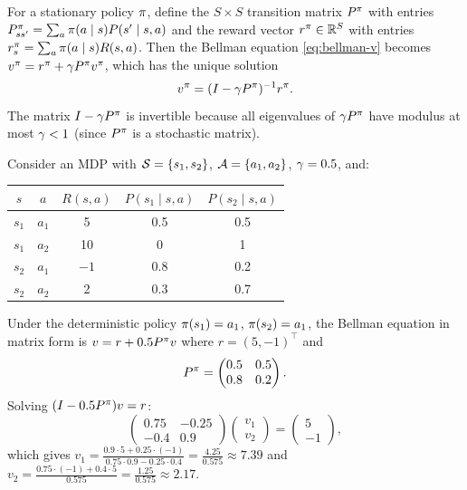 \documentclass[11pt,a4paper]{article}
\begin{document}
\begin{keyresult}[title={Bellman Expectation Equations -- Matrix Form}]
For a stationary policy $\pi$, define the $S \times S$ transition
matrix $P^\pi$ with entries
$P^\pi_{ss'} = \sum_a \pi(a \mid s) P(s' \mid s,a)$ and the
reward vector $r^\pi \in \mathbb{R}^S$ with entries
$r^\pi_s = \sum_a \pi(a \mid s) R(s,a)$. Then the Bellman
equation \eqref{eq:bellman-v} becomes $v^\pi = r^\pi +
\gamma P^\pi v^\pi$, which has the unique solution
\[
    v^\pi = (I - \gamma P^\pi)^{-1} r^\pi.
\]
The matrix $I - \gamma P^\pi$ is invertible because all
eigenvalues of $\gamma P^\pi$ have modulus at most
$\gamma < 1$ (since $P^\pi$ is a stochastic matrix).
\end{keyresult}

\begin{example}
\label{ex:two-state}
Consider an MDP with $\mathcal{S} = \{s_1, s_2\}$,
$\mathcal{A} = \{a_1, a_2\}$, $\gamma = 0.5$, and:
\begin{center}
\begin{tabular}{ccccc}
\toprule
$s$ & $a$ & $R(s,a)$ & $P(s_1 \mid s,a)$ & $P(s_2 \mid s,a)$ \\
\midrule
$s_1$ & $a_1$ & 5 & 0.5 & 0.5 \\
$s_1$ & $a_2$ & 10 & 0 & 1 \\
$s_2$ & $a_1$ & $-1$ & 0.8 & 0.2 \\
$s_2$ & $a_2$ & 2 & 0.3 & 0.7 \\
\bottomrule
\end{tabular}
\end{center}
Under the deterministic policy $\pi(s_1) = a_1$,
$\pi(s_2) = a_1$, the Bellman equation in matrix form is
$v = r + 0.5 P^\pi v$ where $r = (5, -1)^\top$ and
\[
    P^\pi = \begin{pmatrix} 0.5 & 0.5 \\ 0.8 & 0.2 \end{pmatrix}.
\]
Solving $(I - 0.5 P^\pi) v = r$:
\[
    \begin{pmatrix} 0.75 & -0.25 \\ -0.4 & 0.9 \end{pmatrix}
    \begin{pmatrix} v_1 \\ v_2 \end{pmatrix}
    = \begin{pmatrix} 5 \\ -1 \end{pmatrix},
\]
which gives $v_1 = \frac{0.9 \cdot 5 + 0.25 \cdot (-1)}{0.75 \cdot
0.9 - 0.25 \cdot 0.4} = \frac{4.25}{0.575} \approx 7.39$ and
$v_2 = \frac{0.75 \cdot (-1) + 0.4 \cdot 5}{0.575}
= \frac{1.25}{0.575} \approx 2.17$.
\end{example}
\end{document}
